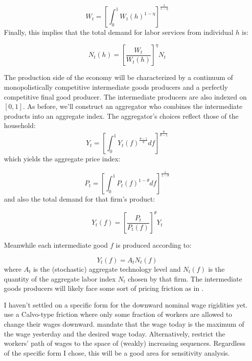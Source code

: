 \documentclass[12pt,a4paper]{article}            %
\begin{document}
\begin{equation*}
    W_t = \left[ \int_{0}^{1} W_t(h)^{ 1 - \eta }  \right]^{ \frac{1}{1 - \eta} }
\end{equation*}
Finally, this implies that the total demand for labor services from individual $h$ is:

\begin{equation*}
    N_t(h) = \left[ \frac{W_t}{W_t(h)}  \right]^{\eta}N_t
\end{equation*}


The production side of the economy will be characterized by a continuum of monopolistically competitive  intermediate goods producers and a perfectly competitive final good producer.
The intermediate producers are also indexed on $[0, 1]$.
As before, we'll construct an aggregator who combines the intermediate products into an aggregate index.  The aggregator's choices reflect those of the household:
\begin{equation*}
    Y_t = \left[\int_{0}^{1} Y_t(f)^{ \frac{\theta - 1}{\theta}} df \right]^{ \frac{\theta}{\theta - 1} }
\end{equation*}
which yields the aggregate price index:

\begin{equation*}
    P_t = \left[\int_{0}^{1} P_t(f)^{1 - \theta} df \right]^{\frac{1}{1 - \theta}}
\end{equation*}
and also the total demand for that firm's product:

\begin{equation*}
    Y_t(f) = \left[ \frac{P_t}{P_t(f)}  \right]^{\theta} Y_t
\end{equation*}

Meanwhile each intermediate good $f$ is produced according to:

\begin{equation*}
    Y_t(f) = A_t N_t(f)
\end{equation*}
where $A_t$ is the (stochastic) aggregate technology level and $N_t(f)$ is the quantity of the aggregate labor index $N_t$ chosen by that firm.
The intermediate goods producers will likely face some sort of pricing friction as in \cite{calvo_1983}.

I haven't settled on a specific form for the downward nominal wage rigidities yet.
\cite{daly_hobijn_2013} use a Calvo-type friction where only some fraction of workers are allowed to change their wages downward.
\cite{coibon_gorodnichenko_wieland_2012} mandate that the wage today is the maximum of the wage yesterday and the desired wage today.
Alternatively, \cite{benigno_ricci_2011} restrict the workers' path of wages to the space of (weakly) increasing sequences.
Regardless of the specific form I chose, this will be a good area for sensitivity analysis.
\end{document}
